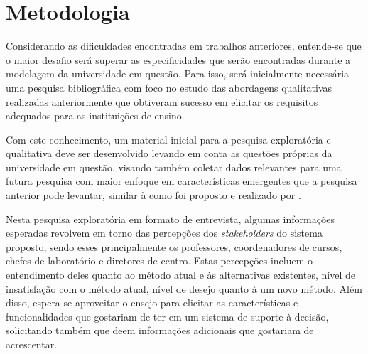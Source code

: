 \section{Metodologia} %


Considerando as dificuldades encontradas em trabalhos anteriores, entende-se que o maior desafio será superar as especificidades que serão encontradas durante a modelagem da universidade em questão. Para isso, será inicialmente necessária uma pesquisa bibliográfica com foco no estudo das abordagens qualitativas realizadas anteriormente que obtiveram sucesso em elicitar os requisitos adequados para as instituições de ensino.


Com este conhecimento, um material inicial para a pesquisa exploratória e qualitativa deve ser desenvolvido levando em conta as questões próprias da universidade em questão, visando também coletar dados relevantes para uma futura pesquisa com maior enfoque em características emergentes que a pesquisa anterior pode levantar, similar à como foi proposto e realizado por \cite{andre_interaction_2018}.

Nesta pesquisa exploratória em formato de entrevista, algumas informações esperadas revolvem em torno das percepções dos \textit{stakeholders} do sistema proposto, sendo esses principalmente os professores, coordenadores de cursos, chefes de laboratório e diretores de centro. Estas percepções incluem o entendimento deles quanto ao método atual e às alternativas existentes, nível de insatisfação com o método atual, nível de desejo quanto à um novo método. Além disso, espera-se aproveitar o ensejo para elicitar as características e funcionalidades que gostariam de ter em um sistema de suporte à decisão, solicitando também que deem informações adicionais que gostariam de acrescentar.

